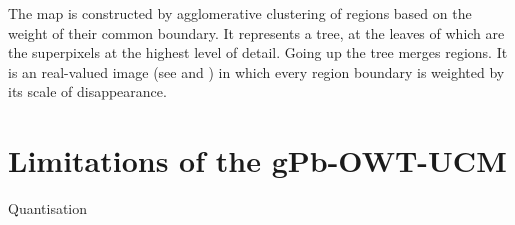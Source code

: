 The map is constructed by agglomerative clustering of regions based on the weight of their common boundary. It represents a tree, at the leaves of which are the superpixels at the highest level of detail. Going up the tree merges regions. It is an real-valued image (see  and ) in which every region boundary is weighted by its scale of disappearance.



\section{Limitations of the gPb-OWT-UCM} %
Quantisation